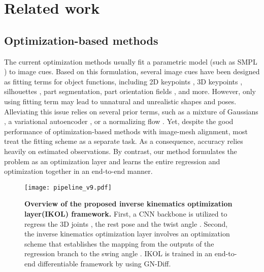 \documentclass[letterpaper]{article} \usepackage{aaai23}  \usepackage{times}  \usepackage{helvet}  \usepackage{courier}  \usepackage[hyphens]{url}  \usepackage{graphicx} \urlstyle{rm} \def\UrlFont{\rm}  \usepackage{natbib}  \usepackage{caption} \frenchspacing  \setlength{\pdfpagewidth}{8.5in}  \setlength{\pdfpageheight}{11in}  \usepackage{algorithm}
\begin{document}
\section{Related work}
\subsection{Optimization-based methods}
The current optimization methods usually fit a parametric model (such as SMPL \cite{loper2015smpl}) to image cues. Based on this formulation, several image cues have been designed as fitting terms for object functions, including 2D keypoints \cite{bogo2016keep}, 3D keypoints \cite{mehta2017vnect,mehta2020xnect,zhang2022mutual}, silhouettes \cite{huang2017towards, lassner2017unite}, part segmentation\cite{zanfir2018monocular}, part orientation fields \cite{xiang2019monocular}, and more\cite{han2022licamgait,liang2022hybridcap}. However, only using fitting term may lead to unnatural and unrealistic shapes and poses. Alleviating this issue relies on several prior terms, such as a mixture of Gaussians \cite{bogo2016keep}, a variational autoencoder \cite{pavlakos2019expressive}, or a normalizing flow \cite{zanfir2020weakly}. Yet, despite the good performance of optimization-based methods with image-mesh alignment, most treat the fitting scheme as a separate task. As a consequence, accuracy relies heavily on estimated observations. By contrast, our method formulates the problem as an optimization layer and learns the entire regression and optimization together in an end-to-end manner.

\begin{figure*}[t]
\centering
\texttt{[image: pipeline\_v9.pdf]}
\caption{\textbf{Overview of the proposed inverse kinematics optimization layer(IKOL) framework.} First, a CNN backbone is utilized to regress the 3D joints , the rest pose  and the twist angle . Second, the inverse kinematics optimization layer involves an optimization scheme that establishes the mapping from the outputs of the regression branch to the swing angle . IKOL is trained in an end-to-end differentiable framework by using GN-Diff.}
\label{Overview}
\end{figure*}
\end{document}
